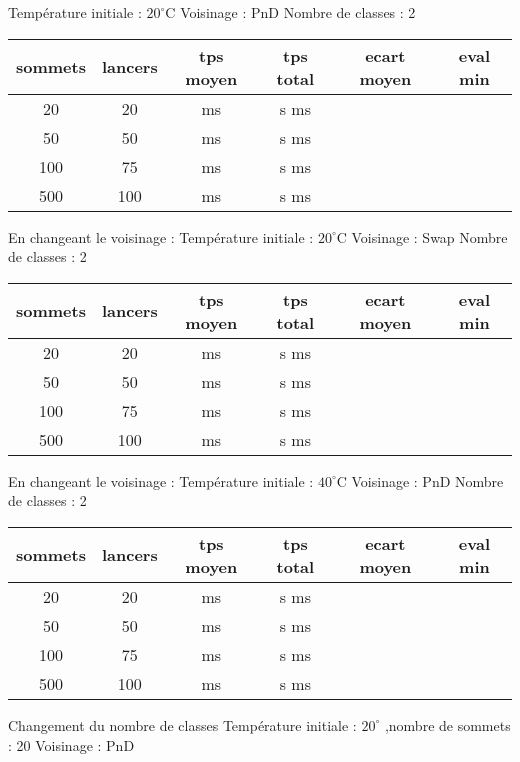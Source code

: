 \documentclass[12pt]{article}
\begin{document}
Température initiale : $20^\circ$C
Voisinage : PnD
Nombre de classes : 2

\begin{tabular}{|c|c|c|c|c|c|}
	\hline 
	sommets & lancers & tps moyen & tps total & ecart moyen & eval min\\
	\hline
	20 & 20 &  ms &  s  ms &  &  \\
	\hline
	 50  &  50  &     ms   &    s    ms   &     &     \\
	\hline
	 100  &  75  &     ms   &   s    ms    &     &     \\
	\hline
	 500  &  100  &      ms  &    s    ms   &     &     \\
	\hline
\end{tabular}
\bigskip

En changeant le voisinage :
Température initiale : $20^\circ$C
Voisinage : Swap
Nombre de classes : 2

\begin{tabular}{|c|c|c|c|c|c|}
	\hline 
	sommets & lancers & tps moyen & tps total & ecart moyen & eval min\\
	\hline
	20 & 20 &  ms &  s  ms &  &  \\
	\hline
	 50  &  50  &     ms   &    s    ms   &     &     \\
	\hline
	 100  &  75  &     ms   &   s    ms    &     &     \\
	\hline
	 500  &  100  &      ms  &    s    ms   &     &     \\
	\hline
\end{tabular}
\bigskip

En changeant le voisinage :
Température initiale : $40^\circ$C
Voisinage : PnD
Nombre de classes : 2

\begin{tabular}{|c|c|c|c|c|c|}
	\hline 
	sommets & lancers & tps moyen & tps total & ecart moyen & eval min\\
	\hline
	20 & 20 &  ms &  s  ms &  &  \\
	\hline
	 50  &  50  &     ms   &    s    ms   &     &     \\
	\hline
	 100  &  75  &     ms   &   s    ms    &     &     \\
	\hline
	 500  &  100  &      ms  &    s    ms   &     &     \\
	\hline
\end{tabular}
\bigskip

Changement du nombre de classes
Température initiale : $20^\circ$ ,nombre de sommets : 20 Voisinage : PnD
\end{document}
